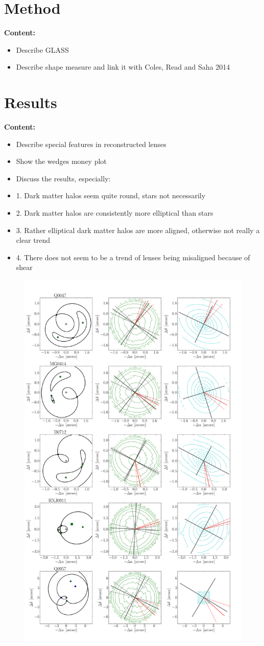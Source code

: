\documentclass[useAMS,usenatbib]{mn2e}
\begin{document}
\section{Method}\label{sec:method}
\textbf{Content:}
\begin{itemize}
\item Describe GLASS
\item Describe shape measure and link it with Coles, Read and Saha 2014
\end{itemize}

\section{Results}\label{sec:results}
\textbf{Content:}
\begin{itemize}
\item Describe special features in reconstructed lenses
\item Show the wedges money plot
\item Discuss the results, especially:
\item 1. Dark matter halos seem quite round, stars not necessarily
\item 2. Dark matter halos are consistently more elliptical than stars
\item 3. Rather elliptical dark matter halos are more aligned, otherwise not really a clear trend
\item 4. There does not seem to be a trend of lenses being misaligned because of shear
\end{itemize}

\begin{figure}
  \centering
  \includegraphics[width=.65\linewidth]{Figures/AllLenses21.pdf}
  \caption[width=.65\linewidth]{}
  \label{fig:lensreconstruction1}
\end{figure}
\end{document}

